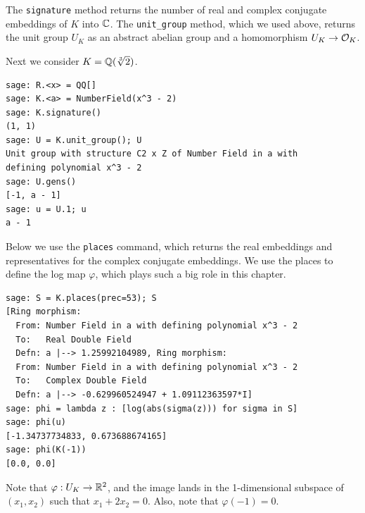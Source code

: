 

The {\tt signature} method returns the
number of real and complex conjugate embeddings
of $K$ into $\mathbb{C}$.  The \verb|unit_group| method,
which we used above, returns the unit group $U_K$
as an abstract abelian group and a homomorphism $U_K\to \mathcal{O}_K$.

Next we consider $K=\mathbb{Q}(\sqrt[3]{2})$.
\begin{lstlisting}
sage: R.<x> = QQ[]
sage: K.<a> = NumberField(x^3 - 2)
sage: K.signature()
(1, 1)
sage: U = K.unit_group(); U
Unit group with structure C2 x Z of Number Field in a with 
defining polynomial x^3 - 2
sage: U.gens()
[-1, a - 1]
sage: u = U.1; u
a - 1
\end{lstlisting}



Below we use the \verb|places| command, which returns the real embeddings
and representatives for the complex conjugate embeddings.
We use the places to define the log map $\varphi$, which plays such a big
role in this chapter. 
\begin{lstlisting}
sage: S = K.places(prec=53); S
[Ring morphism:
  From: Number Field in a with defining polynomial x^3 - 2
  To:   Real Double Field
  Defn: a |--> 1.25992104989, Ring morphism:
  From: Number Field in a with defining polynomial x^3 - 2
  To:   Complex Double Field
  Defn: a |--> -0.629960524947 + 1.09112363597*I]
sage: phi = lambda z : [log(abs(sigma(z))) for sigma in S]
sage: phi(u)
[-1.34737734833, 0.673688674165]
sage: phi(K(-1))
[0.0, 0.0]
\end{lstlisting}
Note that $\varphi:U_K \to \mathbb{R}^2$, and the image lands in the
1-dimensional subspace of $(x_1,x_2)$ such that $x_1 +2x_2 = 0$. Also,
note that $\varphi(-1)=0$.


